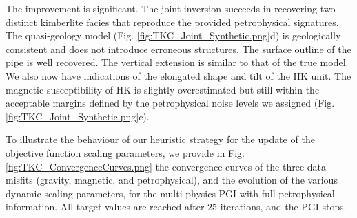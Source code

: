 \documentclass[extra, mreferee]{gji_joint} %
\begin{document}
The improvement is significant. The joint inversion succeeds in recovering two distinct kimberlite facies that reproduce the provided petrophysical signatures. The quasi-geology model (Fig. \ref{fig:TKC_Joint_Synthetic.png}d) is geologically consistent and does not introduce erroneous structures. The surface outline of the pipe is well recovered. The vertical extension is similar to that of the true model. We also now have indications of the elongated shape and tilt of the HK unit. The magnetic susceptibility of HK is slightly overestimated but still within the acceptable margins defined by the petrophysical noise levels we assigned (Fig. \ref{fig:TKC_Joint_Synthetic.png}c).

To illustrate the behaviour of our heuristic strategy for the update of the objective function scaling parameters, we provide in Fig. \ref{fig:TKC_ConvergenceCurves.png} the convergence curves of the three data misfits (gravity, magnetic, and petrophysical), and the evolution of the various dynamic scaling parameters, for the multi-physics PGI with full petrophysical information. All target values are reached after $25$ iterations, and the PGI stops.
\end{document}
